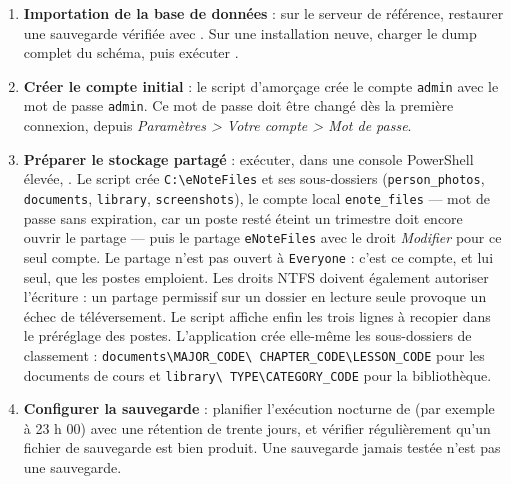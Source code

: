 \begin{enumerate}
          script , après avoir remplacé le mot de passe de
          \texttt{enote\_app}. Le script crée le rôle, la base \texttt{eNote} en \ac{UTF-8}, accorde les
          privilèges sur le schéma et pose les privilèges par défaut pour les tables futures.
    \item \textbf{Importation de la base de données} : sur le serveur de référence, restaurer une
          sauvegarde vérifiée avec . Sur une installation neuve,
          charger le dump complet du schéma, puis exécuter
          .
    \item \textbf{Créer le compte initial} : le script d'amorçage crée le compte \texttt{admin} avec le
          mot de passe \texttt{admin}. Ce mot de passe doit être changé dès la première connexion,
          depuis \emph{Paramètres > Votre compte > Mot de passe}.
    \item \textbf{Préparer le stockage partagé} : exécuter, dans une console PowerShell élevée,
          . Le script crée \texttt{C:\textbackslash eNoteFiles} et
          ses sous-dossiers (\texttt{person\_photos}, \texttt{documents}, \texttt{library},
          \texttt{screenshots}), le compte local \texttt{enote\_files} — mot de passe sans expiration,
          car un poste resté éteint un trimestre doit encore ouvrir le partage — puis le partage
          \texttt{eNoteFiles} avec le droit \emph{Modifier} pour ce seul compte. Le partage n'est pas
          ouvert à \texttt{Everyone} : c'est ce compte, et lui seul, que les postes emploient. Les
          droits NTFS doivent également autoriser l'écriture : un partage permissif sur un dossier en
          lecture seule provoque un échec de téléversement. Le script affiche enfin les trois lignes à
          recopier dans le préréglage des postes. L'application crée elle-même les
          sous-dossiers de classement : \texttt{documents\textbackslash MAJOR\_CODE\textbackslash
          CHAPTER\_CODE\textbackslash LESSON\_CODE} pour les documents de cours et \texttt{library\textbackslash
          TYPE\textbackslash CATEGORY\_CODE} pour la bibliothèque.
    \item \textbf{Configurer la sauvegarde} : planifier l'exécution nocturne de
           (par exemple à 23 h 00) avec une rétention de trente jours,
          et vérifier régulièrement qu'un fichier de sauvegarde est bien produit. Une sauvegarde jamais
          testée n'est pas une sauvegarde.
\end{enumerate}


